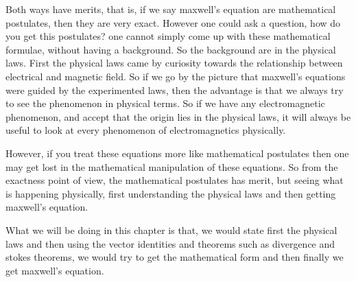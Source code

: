 Both ways have merits, that is, if we say maxwell's equation are mathematical postulates, then they are very exact. However one could ask a question, how do you get this postulates? one cannot simply come up with these mathematical formulae, without having a background. So the background are in the physical laws. First the physical laws came by curiosity towards the relationship between electrical and magnetic field. So if we go by the picture that maxwell's equations were guided by the experimented laws, then the advantage is that we always try to see the phenomenon in physical terms. So if we have any electromagnetic phenomenon, and accept that the origin lies in the physical laws, it will always be useful to look at every phenomenon of electromagnetics physically.

However, if you treat these equations more like mathematical postulates then one may get lost in the mathematical manipulation of these equations. So from the exactness point of view, the mathematical postulates has merit, but seeing what is happening physically, first understanding the physical laws and then getting maxwell's equation.

What we will be doing in this chapter is that, we would state first the physical laws and then using the vector identities and theorems such as divergence and stokes theorems, we would try to get the mathematical form and then finally we get maxwell's equation.

